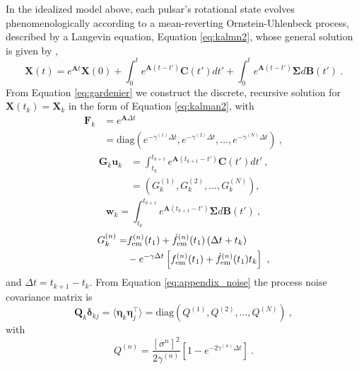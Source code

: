 \documentclass[fleqn,usenatbib,useAMS]{mnras}
\begin{document}
In the idealized model above, each pulsar's rotational state evolves phenomenologically according to a mean-reverting Ornstein-Uhlenbeck process, described by a Langevin equation, Equation \eqref{eq:kalmn2}, whose general solution is given by \citep{gardiner2009stochastic},
\begin{equation}
	\boldsymbol{X}(t) = e^{\boldsymbol{A} t} \boldsymbol{X}(0) + \int_0^t e^{\boldsymbol{A}(t-t')} \boldsymbol{C}(t') dt' + \int_0^t e^{\boldsymbol{A}(t-t')} \boldsymbol{\Sigma} d\boldsymbol{B}(t') \ . \label{eq:gardenier}
\end{equation} 
From Equation \eqref{eq:gardenier} we construct the discrete, recursive solution for $\boldsymbol{X}(t_k) = \boldsymbol{X}_k$ in the form of Equation \eqref{eq:kalman2}, with
\begin{align}
	\boldsymbol{F}_k &= e^{\boldsymbol{A} \Delta t } \  \\
	&= \text{diag}\left(e^{- \gamma^{(1)} \Delta t},e^{- \gamma^{(2)} \Delta t},...,e^{- \gamma^{(N)} \Delta t} \right) \ ,
\end{align}
\begin{align}
	\boldsymbol{G}_k \boldsymbol{u}_k &= \int_{t_k}^{t_{k+1}}  e^{\boldsymbol{A}\left( t_{k+1} - t' \right)}  \boldsymbol{C}(t') dt' \ , \\
	&= \left(G^{(1)}_k, G^{(2)}_k,...,G^{(N)}_k \right) ,
\end{align}
\begin{equation}
	\boldsymbol{w}_k = \int_{t_k}^{t_{k+1}} e^{\boldsymbol{A}\left( t_{k+1} - t' \right)} \boldsymbol{\Sigma} d \boldsymbol{B}(t') \ ,  \label{eq:appendix_noise}
\end{equation}
\begin{align}
	G_k^{(n)} =&    f^{(n)}_{\rm em}(t_1) + \dot{f}^{(n)}_{\rm em}(t_1)  \left(\Delta t + t_k \right) \nonumber \\ 
	&- e^{-\gamma \Delta t} \left[  f^{(n)}_{\rm em}(t_1) +\dot{f}^{(n)}_{\rm em}(t_1)  t_k \right] \ ,
\end{align}
and $\Delta t = t_{k+1} - t_k$. From Equation \eqref{eq:appendix_noise} the process noise covariance matrix is
\begin{equation}
	\boldsymbol{Q}_k \boldsymbol{\delta}_{kj}= \langle \boldsymbol{\eta}_k \boldsymbol{\eta}_j^\intercal \rangle = \text{diag} \left(Q^{(1)}, Q^{(2)},...,Q^{(N)}\right) \ ,
\end{equation}
with 
\begin{equation}
Q^{(n)} = \frac{[\sigma^{n}]^2}{2 \gamma^{(n)}} \left[ 1 - e^{-2 \gamma^{(n)} \Delta t}\right] \ .
\end{equation}
\end{document}
